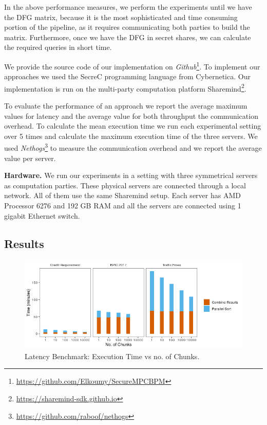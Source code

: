 In the above performance measures, we perform the experiments until we have the DFG matrix, because it is the most sophisticated and time consuming portion of the pipeline, as it requires communicating both parties to build the matrix. Furthermore, once we have the DFG in secret shares, we can calculate the required queries in short time.

We provide the source code of our implementation on \emph{Github}\footnote{\url{https://github.com/Elkoumy/SecureMPCBPM}}. To implement our approaches we used the SecreC programming language from Cybernetica. Our implementation is run on the multi-party computation platform Sharemind\footnote{\url{https://sharemind-sdk.github.io}}.

To evaluate the performance of an approach we report the average maximum values for latency and the average value for both throughput the communication overhead. To calculate the mean execution time we run each experimental setting over 5 times and calculate the maximum execution time of the three servers. We used \emph{Nethogs}\footnote{\url{https://github.com/raboof/nethogs}} to measure the communication overhead and we report the average value per server.


\textbf{Hardware.} We run our experiments in a setting with three symmetrical servers as computation parties. These physical servers are connected through a local network. All of them use the same Sharemind setup. Each server has AMD Processor 6276 and 192 GB RAM and all the servers are connected using 1 gigabit Ethernet switch.


\subsection{Results}
\label{sec:results}


\begin{figure}[!htb]
	\centering
	\includegraphics[width=.95\columnwidth]{figures/latency.png}
	\caption{Latency Benchmark: Execution Time vs no. of Chunks.}
	\label{fig:latency}
\end{figure}

